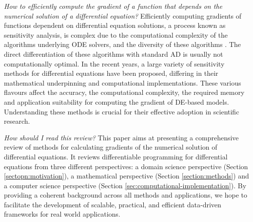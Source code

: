 \textit{How to efficiently compute the gradient of a function that depends on the numerical solution of a differential equation?}
Efficiently computing gradients of functions dependent on differential equation solutions, a process known as sensitivity analysis, is complex due to the computational complexity of the algorithms underlying ODE solvers, and the diversity of these algorithms \cite{hairer-solving-1, hairer-solving-2}. The direct differentiation of these algorithms with standard AD is usually not computationally optimal. In the recent years, a large variety of sensitivity methods for differential equations have been proposed, differing in their mathematical underpinning and computational implementations. These various flavours affect the accuracy, the computational complexity, the required memory and application suitability for computing the gradient of DE-based models. Understanding these methods is crucial for their effective adoption in scientific research. 

\textit{How should I read this review?}
This paper aims at presenting a comprehensive review of methods for calculating gradients of the numerical solution of differential equations. It reviews differentiable programming for differential equations from three different perspectives: a domain science perspective (Section \ref{sectopn:motivation}), a mathematical perspective (Section \ref{section:methods}) and a computer science perspective (Section \ref{sec:computational-implementation}). By providing a coherent background across all methods and applications, we hope to facilitate the development of scalable, practical, and efficient data-driven frameworks for real world applications.
